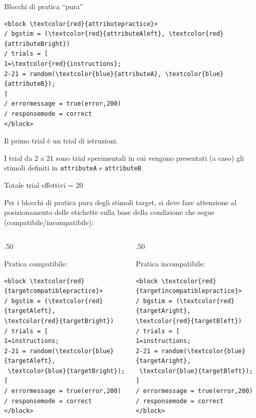\documentclass{beamer}
\begin{document}
\begin{frame}[fragile]{Blocchi di pratica ``pura''}
		\begin{small}
		\begin{Verbatim}[commandchars=\\\{\}]
<block \textcolor{red}{attributepractice}>
/ bgstim = (\textcolor{red}{attributeAleft}, \textcolor{red}{attributeBright})
/ trials = [
1=\textcolor{red}{instructions};
2-21 = random(\textcolor{blue}{attributeA}, \textcolor{blue}{attributeB});
]
/ errormessage = true(error,200)
/ responsemode = correct
</block>			
		\end{Verbatim}

Il primo trial è un trial di istruzioni. 

I trial da 2 a 21 sono trial sperimentali in cui vengono presentati (a caso) gli stimoli definiti in \texttt{attributeA} e \texttt{attributeB}

Totale trial effettivi = 20
	\end{small}
\end{frame}

\begin{frame}[fragile]
	Per i blocchi di pratica pura degli stimoli target, si deve fare attenzione al posizionamento delle etichette sulla base della condizione che segue (compatibile/incompatibile): 
	
	\vspace{3mm}
\begin{columns}
	\begin{column}{.50\linewidth}
	\begin{small}
		Pratica compatibile:
		\begin{Verbatim}[commandchars=\\\{\}]
<block \textcolor{red}{targetcompatiblepractice}>
/ bgstim = (\textcolor{red}{targetAleft}, 
\textcolor{red}{targetBright})
/ trials = [
1=instructions;
2-21 = random(\textcolor{blue}{targetAleft},
 \textcolor{blue}{targetBright});
]
/ errormessage = true(error,200)
/ responsemode = correct
</block>
		\end{Verbatim}
	\end{small}
	\end{column}
\begin{column}{.50\linewidth}
	\begin{small}
		Pratica incompatibile:
		\begin{Verbatim}[commandchars=\\\{\}]
<block \textcolor{red}{targetincompatiblepractice}>
/ bgstim = (\textcolor{red}{targetAright}, 
\textcolor{red}{targetBleft})
/ trials = [
1=instructions;
2-21 = random(\textcolor{blue}{targetAright},
 \textcolor{blue}{targetBleft});
]
/ errormessage = true(error,200)
/ responsemode = correct
</block>
		\end{Verbatim}
	\end{small}
\end{column}
\end{columns}
\end{frame}
\end{document}
